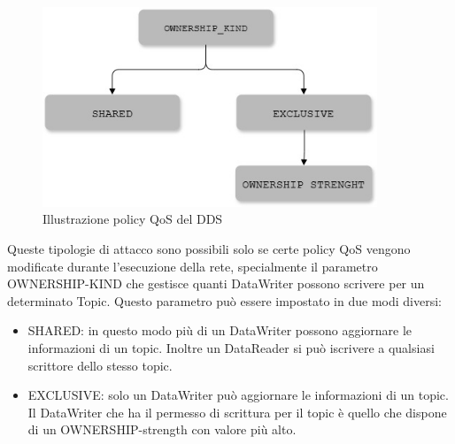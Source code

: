 %     


\begin{figure}[H]
	\centering
    \includegraphics[width=10cm, keepaspectratio]{img/Policy QoS DDS_2.jpg}
	\caption{Illustrazione policy QoS del DDS}\label{Mappa QoS}
\end{figure}

Queste tipologie di attacco sono possibili solo se certe policy QoS vengono
modificate durante l'esecuzione della rete, specialmente il parametro 
OWNERSHIP-KIND che gestisce quanti DataWriter possono scrivere per un
determinato Topic. Questo parametro può essere impostato in due modi diversi:
\begin{itemize}
    \item SHARED: in questo modo più di un DataWriter possono aggiornare le
    informazioni di un topic. Inoltre un DataReader si può iscrivere a
    qualsiasi scrittore dello stesso topic.
    \item EXCLUSIVE: solo un DataWriter può aggiornare le informazioni di un
    topic. Il DataWriter che ha il permesso di scrittura per il topic è quello
    che dispone di un OWNERSHIP-strength con valore più alto.
\end{itemize}


